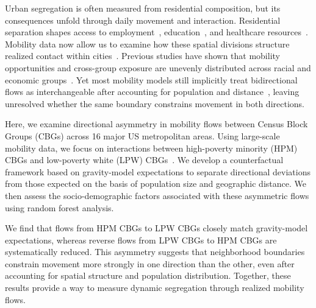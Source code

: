 \documentclass[9pt,twocolumn,twoside]{pnas-new}
\begin{document}

\maketitle
\thispagestyle{firststyle}

\Firstpage

Urban segregation is often measured from residential composition, but its consequences unfold through daily movement and interaction. Residential separation shapes access to employment~\cite{hellerstein2008workplace}, education~\cite{baker2023horizontal}, and healthcare resources~\cite{bor2017population, white2011racial, williams2001racial}. Mobility data now allow us to examine how these spatial divisions structure realized contact within cities~\cite{gonzalez2008understanding, song2010limits, athey2021estimating}. Previous studies have shown that mobility opportunities and cross-group exposure are unevenly distributed across racial and economic groups~\cite{moro2021mobility, xu2019quantifying, wang2018urban, candipan2021residence, nilforoshan2023human, massenkoff2023rubbing}. Yet most mobility models still implicitly treat bidirectional flows as interchangeable after accounting for population and distance~\cite{barbosa2018human, piovani2018measuring, simini2013human, anderson2011gravity}, leaving unresolved whether the same boundary constrains movement in both directions.

Here, we examine directional asymmetry in mobility flows between Census Block Groups (CBGs) across 16 major US metropolitan areas. Using large-scale mobility data, we focus on interactions between high-poverty minority (HPM) CBGs and low-poverty white (LPW) CBGs~\cite{wilson2009more}. We develop a counterfactual framework based on gravity-model expectations to separate directional deviations from those expected on the basis of population size and geographic distance. We then assess the socio-demographic factors associated with these asymmetric flows using random forest analysis.

We find that flows from HPM CBGs to LPW CBGs closely match gravity-model expectations, whereas reverse flows from LPW CBGs to HPM CBGs are systematically reduced. This asymmetry suggests that neighborhood boundaries constrain movement more strongly in one direction than the other, even after accounting for spatial structure and population distribution. Together, these results provide a way to measure dynamic segregation through realized mobility flows.
\end{document}
